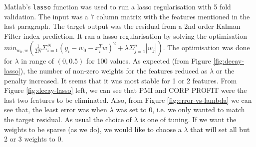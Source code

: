 \documentclass[11pt, fleqn]{article}
\begin{document}
Matlab's \texttt{lasso} function was used to run a lasso regularisation with 5 fold validation. The input was a 7 column matrix with the features mentioned in the last paragraph. The target output was the residual from a 2nd order Kalman Filter index prediction. It ran a lasso regularisation by solving the optimisation $min_{w_0, w}(\frac{1}{2N}\Sigma_{i=1}^N(y_i - w_0 - x_i^Tw)^2 + \lambda\Sigma_{j=1}^p|w_j|)$. The optimisation was done for $\lambda$ in range of $(0,0.5)$ for 100 values. As expected (from Figure \ref{fig:decay-lasso}), the number of non-zero weights for the features reduced as $\lambda$ or the penalty increased. It seems that it was most stable for 1 or 2 features. From Figure \ref{fig:decay-lasso} left, we can see that PMI and CORP PROFIT were the last two features to be eliminated. Also, from Figure \ref{fig:error-vs-lambda} we can see that, the least error was when $\lambda$ was set to 0, i.e. we only wanted to match the target residual. As usual the choice of $\lambda$ is one of tuning. If we want the weights to be sparse (as we do), we would like to choose a $\lambda$ that will set all but 2 or 3 weights to 0.\\
\end{document}
